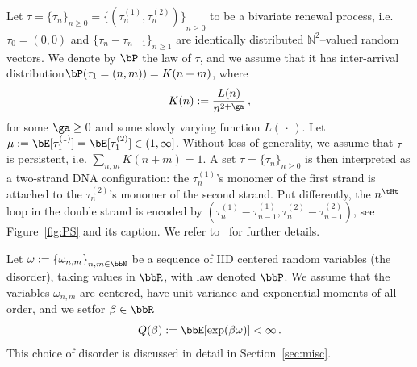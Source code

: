 Let $\tau = {\lbrace \tau_n \rbrace}_{n\geq 0}= {\lbrace (\tau_n^{(1)}, \tau_n^{(2)}) \rbrace}_{n\geq 0}$ to be a bivariate renewal process, i.e. $\tau_0 = (0,0)$ and $\{ \tau_{n} - \tau_{n-1}\}_{n \geq 1}$ are identically distributed $\mathbb{N}^2$--valued random vectors. We denote by $\bP$ the law of $\tau$, and we assume that it has inter-arrival distribution\linebreak $\bP(\tau_1= (n,m))= K(n+m)$, where
\begin{equation}\label{def:Kn}
K(n) := \frac{L(n)}{n^{2+\ga}}\,,
\end{equation}
for some $\ga \ge 0$ and some slowly varying function $L({\,\cdot\,})$. Let $\mu := \bE [\tau_1^{(1)}]= \bE [\tau_1^{(2)}]\in (1, \infty]$. Without loss of generality, we assume that $\tau$ is persistent, i.e. $\sum_{n,m} K(n+m) =1$. A set $\tau={\lbrace \tau_n \rbrace}_{n\geq 0}$ is then interpreted as a two-strand DNA configuration: the $\tau_n^{(1)}$'s monomer of the first strand is attached to the $\tau_n^{(2)}$'s monomer of the second strand. Put differently, the $n^{\tHt}$ loop in the double strand is encoded by $(\tau_n^{(1)}-\tau_{n-1}^{(1)},\tau_n^{(2)}-\tau_{n-1}^{(2)})$, see Figure~\ref{fig:PS} and its caption. We refer to~\cite{cf:GK} for further details.

Let $ \omega := { \lbrace \omega_{n,m} \rbrace }_{n,m \in \bbN}$ be a sequence of IID centered random variables (the disorder), taking values in $\bbR$, with law denoted $\bbP$. We assume that the variables $\omega_{n,m}$ are centered, have unit variance and exponential moments of all order, and we set\linebreak for $\beta \in \bbR$
\begin{equation}\label{eq:defQ}
Q(\beta) := \bbE [\exp(\beta \omega)] < \infty\,.
\end{equation}
This choice of disorder is discussed in detail in Section~\ref{sec:misc}.

